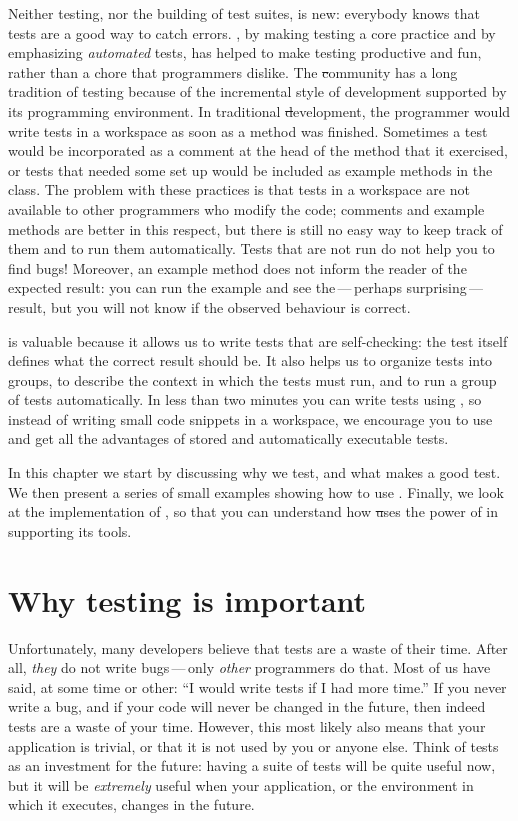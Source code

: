 \documentclass[a4paper,10pt,twoside]{book}
\begin{document}
Neither testing, nor the building of test suites, is new:  everybody knows that
tests are a good way to catch errors.
\mbox{,} by making testing a
core practice and by emphasizing \emph{automated} tests, 
has helped to make testing productive and fun, rather than a 
chore that programmers dislike.
The \st community has a long tradition of
testing because of the incremental style of development supported by its
programming environment.  
In traditional \st development, the programmer would write tests in a workspace 
as soon as a method was finished.
Sometimes a test would be incorporated as a comment at the head of the method that it exercised, or tests that needed some set up would be included as example methods in the class.
The problem with these practices is that tests in a workspace are not available to other programmers who modify the code; comments and example methods are better in this respect, 
but there is still no easy way to keep track of them and
to run them automatically.
Tests that are not run do not help you to find bugs!
Moreover, an example method does not
inform the reader of the expected result:
you can run the example and see the\,---\,perhaps surprising\,---\,result, 
but you will not know if the observed behaviour is correct.

\sunit is valuable because it allows us to write tests that are self-checking:
the test itself defines what the correct result should be.
It also helps us to
organize tests into groups, to describe the context in which the tests must run, and to
run a group of tests
automatically.  In less than two minutes you can write tests using
\sunit, so instead of writing small code snippets in a workspace, we encourage you
to use \sunit and get all the
advantages of stored and automatically executable tests.

In this chapter we start by discussing why we test, and what makes a good test. We then present a series of small 
examples showing how to use \sunit.
Finally, we look at the implementation of \sunit, so that you can understand how
\st uses the power of  in supporting its tools. 

\section{Why testing is important}
\label{sec:why}

Unfortunately, many developers believe that tests are a waste of their time.  
After all, \emph{they} do not write bugs\,---\,only \emph{other} programmers do that.
Most of us have said, at some time or other:
``I would write tests if I had more time.''
If you never write a bug, and if your code will never be changed in the future,
then indeed tests are a waste of your time.
However, this most likely
also means that your application is trivial, or that it is not used by you or anyone else.  
Think of tests as an investment for the future: having a
suite of tests will be quite useful now, but it will be \emph{extremely} useful when
your application, or the environment in which it executes, changes in the future.
\end{document}
